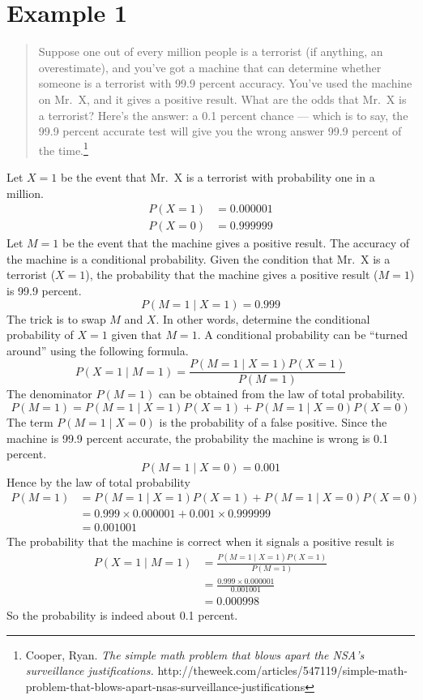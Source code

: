 \documentclass[12pt]{article}
\begin{document}
\section*{Example 1}

\begin{quote}
Suppose one out of every million people is a terrorist
(if anything, an overestimate), and you've got a machine
that can determine whether someone is a terrorist with 99.9 percent accuracy.
You've used the machine on Mr.~X, and it gives a positive result.
What are the odds that Mr.~X is a terrorist?
Here's the answer: a 0.1 percent chance --- which is to say,
the 99.9 percent accurate test will give you the wrong answer 99.9
percent of the time.\footnote{
Cooper, Ryan.
{\it The simple math problem that blows apart the NSA's surveillance justifications.}
http://theweek.com/articles/547119/simple-math-problem-that-blows-apart-nsas-surveillance-justifications}
\end{quote}

Let $X=1$ be the event that Mr.~X is a terrorist with probability
one in a million.
\begin{align*}
P(X{=}1)&=0.000001\\
P(X{=}0)&=0.999999
\end{align*}
Let $M=1$ be the event that the machine gives a positive result.
The accuracy of the machine is a conditional probability.
Given the condition that Mr.~X is a terrorist ($X=1$),
the probability that the machine gives a positive result ($M=1$)
is 99.9 percent.
\[
P(M{=}1\mid X{=}1)=0.999
\]
The trick is to swap $M$ and $X$.
In other words, determine the conditional probability of $X=1$ given that $M=1$.
A conditional probability can be ``turned around'' using the following formula.
\[
P(X{=}1\mid M{=1})=\frac{P(M{=}1\mid X{=}1)P(X{=}1)}{P(M{=}1)}
\]
The denominator $P(M{=}1)$ can be obtained from the law of total probability.
\[
P(M{=}1)=P(M{=}1\mid X{=}1)P(X{=}1)+P(M{=}1\mid X{=}0)P(X{=}0)
\]
The term $P(M{=}1\mid X{=}0)$ is the probability of a false positive.
Since the machine is 99.9 percent accurate,
the probability the machine is wrong is 0.1 percent.
\[
P(M{=}1\mid X{=}0)=0.001
\]
Hence by the law of total probability
\begin{align*}
P(M{=}1)
&=P(M{=}1\mid X{=}1)P(X{=}1)+P(M{=}1\mid X{=}0)P(X{=}0)\\
&=0.999\times0.000001+0.001\times0.999999\\
&=0.001001
\end{align*}
The probability that the machine is correct when it signals a positive result is
\begin{align*}
P(X{=}1\mid M{=1})
&=\frac{P(M{=}1\mid X{=}1)P(X{=}1)}{P(M{=}1)}\\
&=\frac{0.999\times0.000001}{0.001001}\\
&=0.000998
\end{align*}
So the probability is indeed about 0.1 percent.
\end{document}
